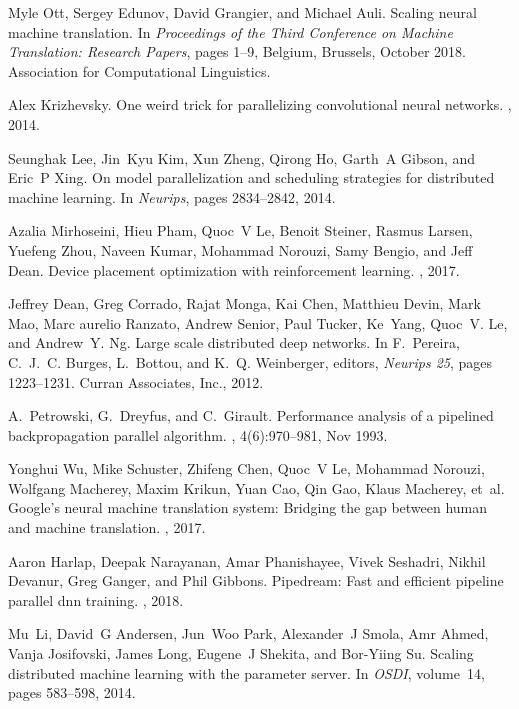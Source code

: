 \documentclass{article}
\begin{document}
\begin{thebibliography}{10}
Myle Ott, Sergey Edunov, David Grangier, and Michael Auli.
\newblock Scaling neural machine translation.
\newblock In {\em Proceedings of the Third Conference on Machine Translation:
  Research Papers}, pages 1--9, Belgium, Brussels, October 2018. Association
  for Computational Linguistics.

Alex Krizhevsky.
\newblock One weird trick for parallelizing convolutional neural networks.
, 2014.

Seunghak Lee, Jin~Kyu Kim, Xun Zheng, Qirong Ho, Garth~A Gibson, and Eric~P
  Xing.
\newblock On model parallelization and scheduling strategies for distributed
  machine learning.
\newblock In {\em Neurips}, pages 2834--2842, 2014.

Azalia Mirhoseini, Hieu Pham, Quoc~V Le, Benoit Steiner, Rasmus Larsen, Yuefeng
  Zhou, Naveen Kumar, Mohammad Norouzi, Samy Bengio, and Jeff Dean.
\newblock Device placement optimization with reinforcement learning.
, 2017.

Jeffrey Dean, Greg Corrado, Rajat Monga, Kai Chen, Matthieu Devin, Mark Mao,
  Marc aurelio Ranzato, Andrew Senior, Paul Tucker, Ke~Yang,
  Quoc~V. Le, and Andrew~Y. Ng.
\newblock Large scale distributed deep networks.
\newblock In F.~Pereira, C.~J.~C. Burges, L.~Bottou, and K.~Q. Weinberger,
  editors, {\em Neurips 25}, pages 1223--1231. Curran Associates, Inc., 2012.

A.~Petrowski, G.~Dreyfus, and C.~Girault.
\newblock Performance analysis of a pipelined backpropagation parallel
  algorithm.
, 4(6):970--981, Nov 1993.

Yonghui Wu, Mike Schuster, Zhifeng Chen, Quoc~V Le, Mohammad Norouzi, Wolfgang
  Macherey, Maxim Krikun, Yuan Cao, Qin Gao, Klaus Macherey, et~al.
\newblock Google's neural machine translation system: Bridging the gap between
  human and machine translation.
,
  2017.

Aaron Harlap, Deepak Narayanan, Amar Phanishayee, Vivek Seshadri, Nikhil
  Devanur, Greg Ganger, and Phil Gibbons.
\newblock Pipedream: Fast and efficient pipeline parallel dnn training.
, 2018.

Mu~Li, David~G Andersen, Jun~Woo Park, Alexander~J Smola, Amr Ahmed, Vanja
  Josifovski, James Long, Eugene~J Shekita, and Bor-Yiing Su.
\newblock Scaling distributed machine learning with the parameter server.
\newblock In {\em OSDI}, volume~14, pages 583--598, 2014.

\end{thebibliography}
 
\end{document}
